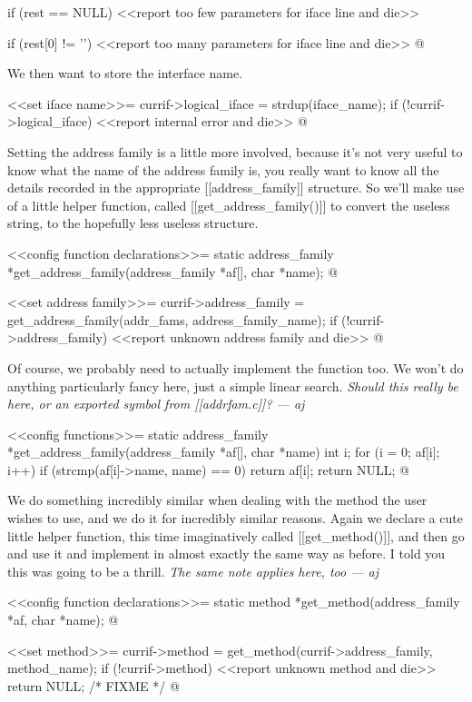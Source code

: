 \documentclass{article}
\begin{document}
if (rest == NULL) {
	<<report too few parameters for iface line and die>>
}

if (rest[0] != '\0') {
	<<report too many parameters for iface line and die>>
}
@ 

We then want to store the interface name.

<<set iface name>>=
currif->logical_iface = strdup(iface_name);
if (!currif->logical_iface) {
	<<report internal error and die>>
}
@ 

Setting the address family is a little more involved, because it's not
very useful to know what the name of the address family is, you really
want to know all the details recorded in the appropriate
[[address_family]] structure. So we'll make use of a little helper
function, called [[get_address_family()]] to convert the useless
string, to the hopefully less useless structure.

<<config function declarations>>=
static address_family *get_address_family(address_family *af[], char *name);
@ 

<<set address family>>=
currif->address_family = get_address_family(addr_fams, address_family_name);
if (!currif->address_family) {
	<<report unknown address family and die>>
}
@ 

Of course, we probably need to actually implement the function too. We
won't do anything particularly fancy here, just a simple linear
search. \emph{Should this really be here, or an exported symbol from
[[addrfam.c]]? --- aj}

<<config functions>>=
static address_family *get_address_family(address_family *af[], char *name) {
	int i;
	for (i = 0; af[i]; i++) {
		if (strcmp(af[i]->name, name) == 0) {
			return af[i];
		}
	}
	return NULL;
}
@

We do something incredibly similar when dealing with the method the
user wishes to use, and we do it for incredibly similar reasons. Again
we declare a cute little helper function, this time imaginatively
called [[get_method()]], and then go and use it and implement in
almost exactly the same way as before. I told you this was going to be
a thrill. \emph{The same note applies here, too --- aj}

<<config function declarations>>=
static method *get_method(address_family *af, char *name);
@ 

<<set method>>=
currif->method = get_method(currif->address_family, method_name);
if (!currif->method) {
	<<report unknown method and die>>
	return NULL; /* FIXME */
}
@
\end{document}
